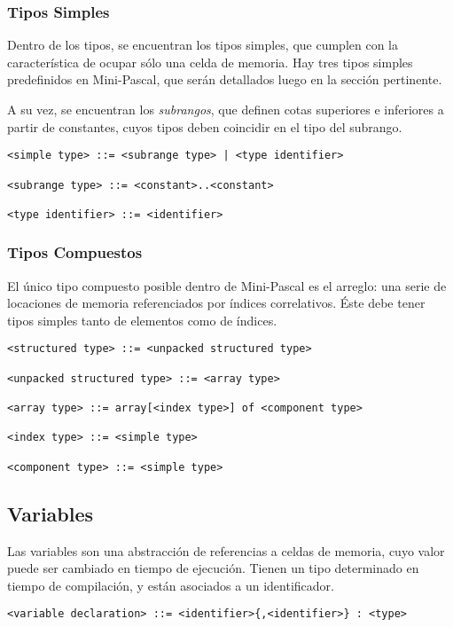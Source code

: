 \documentclass[a4paper,oneside]{report}
\begin{document}
\subsubsection{Tipos Simples}

Dentro de los tipos, se encuentran los tipos simples, que cumplen con la característica de ocupar sólo una celda de memoria. Hay tres tipos simples predefinidos en Mini-Pascal, que serán detallados luego en la sección pertinente.

A su vez, se encuentran los \textit{subrangos}, que definen cotas superiores e inferiores a partir de constantes, cuyos tipos deben coincidir en el tipo del subrango.

\begin{verbatim}
<simple type> ::= <subrange type> | <type identifier>

<subrange type> ::= <constant>..<constant>

<type identifier> ::= <identifier>
\end{verbatim}

\subsubsection{Tipos Compuestos}

El único tipo compuesto posible dentro de Mini-Pascal es el arreglo: una serie de locaciones de memoria referenciados por índices correlativos. Éste debe tener tipos simples tanto de elementos como de índices.
\begin{verbatim}
<structured type> ::= <unpacked structured type>

<unpacked structured type> ::= <array type>

<array type> ::= array[<index type>] of <component type>

<index type> ::= <simple type>

<component type> ::= <simple type>
\end{verbatim}

\subsection{Variables}

Las variables son una abstracción de referencias a celdas de memoria, cuyo valor puede ser cambiado en tiempo de ejecución. Tienen un tipo determinado en tiempo de compilación, y están asociados a un identificador.

\begin{verbatim}
<variable declaration> ::= <identifier>{,<identifier>} : <type>
\end{verbatim}
\end{document}
